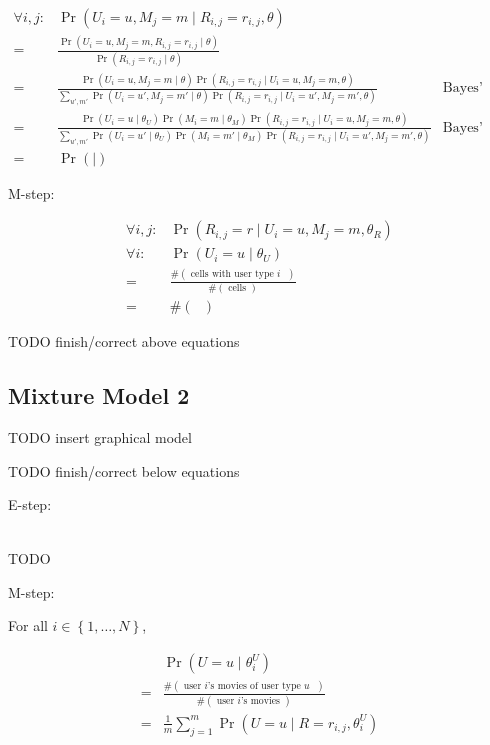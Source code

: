 \documentclass{article}
\newcommand{\PO}[1]{{ \Pr \left( #1 \right) }}
\newcommand{\PP}[2]{{ \PO{ #1 \mid #2 } }}
\newcommand{\N}[1]{{ \# \left( \textrm{ #1 } \right) }}
\newcommand{\range}[1]{{ \left\{ 1, \dots, #1 \right\} }}
\begin{document}
\begin{align*}
  \forall i,j:
  & \PP{ U_i = u, M_j = m }{ R_{i,j} = r_{i,j}, \theta } \\
  =& \frac{
    \PP{ U_i = u, M_j = m, R_{i,j} = r_{i,j} }{ \theta }
  }{
    \PP{ R_{i,j} = r_{i,j} }{ \theta }
  } \\
  =& \frac{
    \PP{ U_i = u, M_j = m }{ \theta }
    \PP{ R_{i,j} = r_{i,j} }{ U_i = u, M_j = m, \theta }
  }{
    \sum_{u',m'}
    \PP{ U_i = u', M_j = m' }{ \theta }
    \PP{ R_{i,j} = r_{i,j} }{ U_i = u', M_j = m', \theta }
  } & \textrm{Bayes' rule} \\
  =& \frac{
    \PP{ U_i = u }{ \theta_U }
    \PP{ M_i = m }{ \theta_M }
    \PP{ R_{i,j} = r_{i,j} }{ U_i = u, M_j = m, \theta }
  }{
    \sum_{u',m'}
    \PP{ U_i = u' }{ \theta_U }
    \PP{ M_i = m' }{ \theta_M }
    \PP{ R_{i,j} = r_{i,j} }{ U_i = u', M_j = m', \theta }
  } & \textrm{Bayes' rule} \\
  =& \PP{}{}
\end{align*}

M-step:

\begin{align*}
\forall i,j: &
\PP{ R_{i,j} = r }{ U_i = u, M_j = m, \theta_R } \\
\forall i: &
\PP{ U_i = u }{ \theta_U } \\
=& \frac{
  \N{cells with user type $i$}
}{
  \N{cells}
}\\
=& \N{}
\end{align*}

TODO finish/correct above equations

\subsection{Mixture Model 2}

TODO insert graphical model

TODO finish/correct below equations

E-step:

\begin{align*}
\end{align*}

TODO

M-step:

For all $i \in \range{N}$,

\begin{align*}
  & \PP{ U = u }{ \theta^U_i } \\
  =& \frac{ \N{user $i$'s movies of user type $u$} }{ \N{user
      $i$'s movies} } \\
  =& \frac{1}{m} \sum_{j=1}^m \PP{ U = u }{ R = r_{i,j}, \theta^U_i }
\end{align*}
\end{document}

